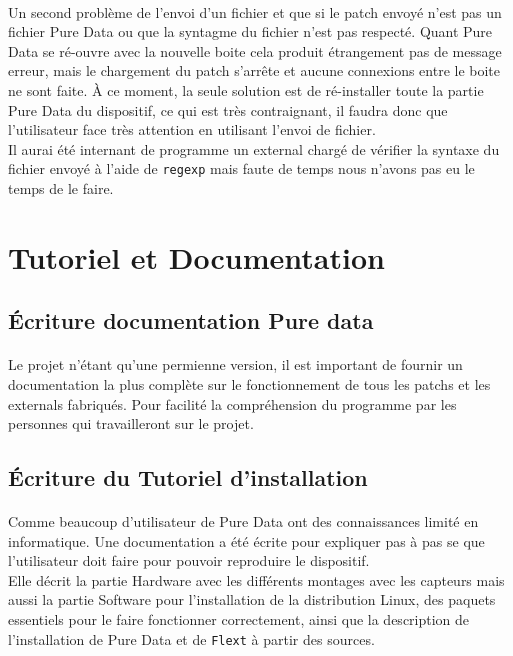 \documentclass[a4paper, titlepage, oneside, 12pt]{article}%
\begin{document}
\paragraph{}
Un second problème de l'envoi d'un fichier et que si le patch envoyé n'est pas un fichier Pure Data ou que la syntagme du fichier n'est pas respecté. Quant Pure Data se ré-ouvre avec la nouvelle boite cela produit étrangement pas de message erreur, mais le chargement du patch s’arrête et aucune connexions entre le boite ne sont faite. 
À ce moment, la seule solution est de ré-installer toute la partie Pure Data du dispositif, ce qui est très contraignant, il faudra donc que l'utilisateur face très attention en utilisant l'envoi de fichier.\\
Il aurai été internant de programme un external chargé de vérifier la syntaxe du fichier envoyé à l'aide de \texttt{regexp} mais faute de temps nous n'avons pas eu le temps de le faire.   

\section{Tutoriel et Documentation}
\subsection{Écriture documentation Pure data}
\paragraph{}
Le projet n’étant qu'une permienne version, il est important de fournir un documentation la plus complète sur le fonctionnement de tous les patchs et les externals fabriqués. Pour facilité la compréhension du programme par les personnes qui travailleront sur le projet.
\subsection{Écriture du Tutoriel d'installation}
\paragraph{}
Comme beaucoup d'utilisateur de Pure Data ont des connaissances limité en informatique. Une documentation a été écrite pour expliquer pas à pas se que l'utilisateur doit faire pour pouvoir reproduire le dispositif.\\
Elle décrit la partie Hardware avec les différents montages avec les capteurs mais aussi la partie Software pour l'installation de la distribution Linux, des paquets essentiels pour le faire fonctionner correctement, ainsi que la description de l'installation de Pure Data et de \texttt{Flext} à partir des sources.
\end{document}
